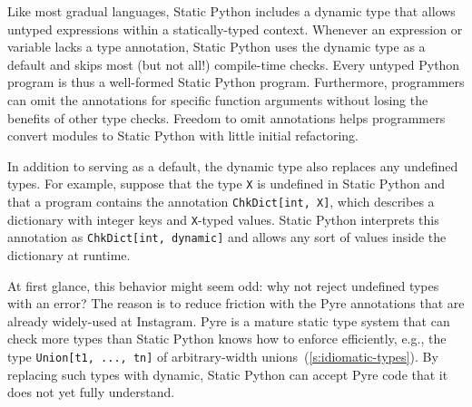 \documentclass[english,cleveref,submission]{programming}
\newcommand{\SP}{Static Python}
\newcommand{\code}[1]{\texttt{#1}}
\begin{document}


Like most gradual languages, \SP{} includes a dynamic type
that allows untyped expressions within a statically-typed context.
Whenever an expression or variable lacks a type annotation, \SP{} uses the
dynamic type as a default and skips most (but not all!) compile-time checks.
Every untyped Python program is thus a well-formed \SP{} program.
Furthermore, programmers can omit the annotations for specific
function arguments without losing the benefits of other type checks.
Freedom to omit annotations helps programmers convert modules to \SP{}
with little initial refactoring.

In addition to serving as a default, the dynamic type also replaces any undefined types.
For example, suppose that the type \code{X} is undefined in \SP{} and that a
program contains the annotation \code{ChkDict[int, X]}, which describes a
dictionary with integer keys and \code{X}-typed values.
\SP{} interprets this annotation as \code{ChkDict[int, dynamic]} and allows any sort
of values inside the dictionary at runtime.

At first glance, this behavior might seem odd: why not reject undefined types with an error?
The reason is to reduce friction with the Pyre annotations that are already
widely-used at Instagram.
Pyre is a mature static type system that can check more types than \SP{} knows how to enforce
efficiently, e.g., the type \code{Union[t1, ..., tn]} of arbitrary-width unions~(\cref{s:idiomatic-types}).
By replacing such types with dynamic, \SP{} can accept Pyre code that it does not yet fully understand.
\end{document}

